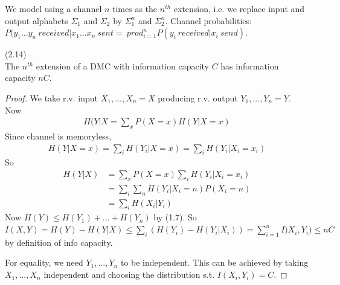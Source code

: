 \documentclass[a4paper]{article}
\begin{document}
We model using a channel $n$ times as the $n^{th}$ extension, i.e. we replace input and output alphabets $\Sigma_1$ and $\Sigma_2$ by $\Sigma_1^n$ and $\Sigma_2^n$. Channel probabilities: $P(y_1...y_n\ received | x_1...x_n\ sent =\ prod_{i=1}^n P(y_i\ received| x_i\ send)$.

\begin{lemma} (2.14)\\
The $n^{th}$ extension of a DMC with information capacity $C$ has information capacity $nC$.
\begin{proof}
We take r.v. input $X_1,...,X_n = X$ producing r.v. output $Y_1,...,Y_n = Y$. Now
\begin{equation*}
\begin{aligned}
H(Y|X = \sum_x P(X=x) H(Y|X=x)
\end{aligned}
\end{equation*}
Since channel is memoryless,
\begin{equation*}
\begin{aligned}
H(Y|X=x) = \sum_i H(Y_i|X=x) = \sum_i H(Y_i|X_i=x_i)
\end{aligned}
\end{equation*}
So
\begin{equation*}
\begin{aligned}
H(Y|X) &= \sum_x P(X=x) \sum_i H(Y_i|X_i = x_i)\\
&= \sum_i \sum_n H(Y_i|X_i = n) P(X_i = n)\\
&= \sum_i H(X_i | Y_i)
\end{aligned}
\end{equation*}
Now $H(Y) \leq H(Y_1)+...+H(Y_n)$ by (1.7). So $I(X,Y) = H(Y)-H(Y|X) \leq \sum_i (H(Y_i)-H(Y_i|X_i)) = \sum_{i=1}^n I)X_i,Y_i) \leq nC$ by definition of info capacity.

For equality, we need $Y_1,...,Y_n$ to be independent. This can be achieved by taking $X_1,...,X_n$ independent and choosing the distribution s.t. $I(X_i,Y_i) = C$.

\end{proof}
\end{lemma}

\end{document}

